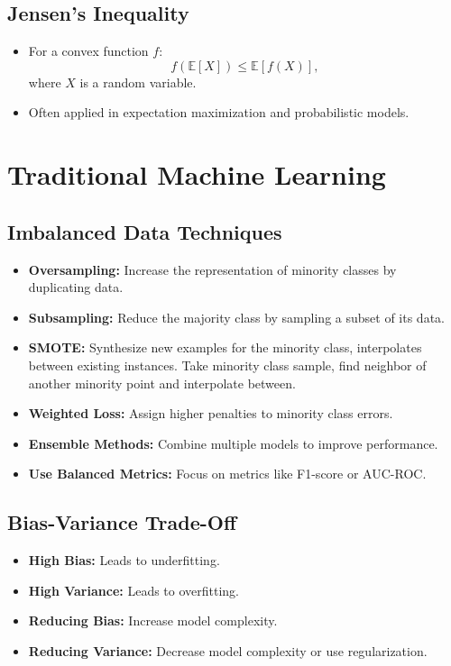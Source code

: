 \documentclass[12pt,a4paper]{article}
\begin{document}
\subsection{Jensen's Inequality}
\begin{itemize}
    \item For a convex function $f$:
    \[ f\left(\mathbb{E}[X]\right) \leq \mathbb{E}[f(X)], \]
    where $X$ is a random variable.
    \item Often applied in expectation maximization and probabilistic models.
\end{itemize}
\pagebreak
\section{Traditional Machine Learning}
\subsection{Imbalanced Data Techniques}
\begin{itemize}
    \item \textbf{Oversampling:} Increase the representation of minority classes by duplicating data.
    \item \textbf{Subsampling:} Reduce the majority class by sampling a subset of its data.
    \item \textbf{SMOTE:} Synthesize new examples for the minority class, interpolates between existing instances. Take minority class sample, find neighbor of another minority point and interpolate between.
    \item \textbf{Weighted Loss:} Assign higher penalties to minority class errors.
    \item \textbf{Ensemble Methods:} Combine multiple models to improve performance.
    \item \textbf{Use Balanced Metrics:} Focus on metrics like F1-score or AUC-ROC.
\end{itemize}

\subsection{Bias-Variance Trade-Off}
\begin{itemize}
    \item \textbf{High Bias:} Leads to underfitting.
    \item \textbf{High Variance:} Leads to overfitting.
    \item \textbf{Reducing Bias:} Increase model complexity.
    \item \textbf{Reducing Variance:} Decrease model complexity or use regularization.
\end{itemize}
\end{document}
